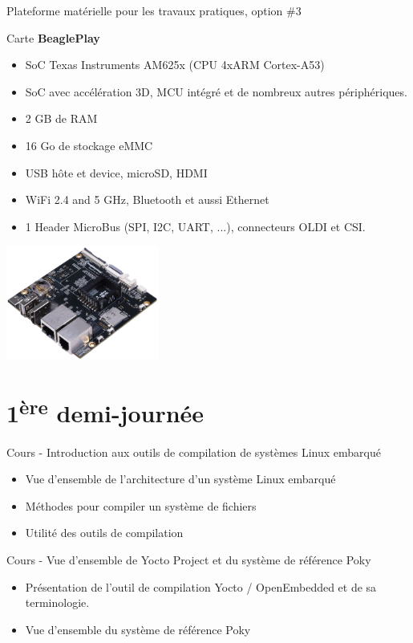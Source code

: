 \documentclass[a4paper,12pt,obeyspaces,spaces,hyphens]{article}
\begin{document}
\feagendatwocolumn
{Plateforme matérielle pour les travaux pratiques, option \#3}
{
  Carte {\bf BeaglePlay}
  \begin{itemize}
    \item SoC Texas Instruments AM625x (CPU 4xARM Cortex-A53)
    \item SoC avec accélération 3D, MCU intégré et de nombreux autres périphériques.
    \item 2 GB de RAM
    \item 16 Go de stockage eMMC
    \item USB hôte et device, microSD, HDMI
    \item WiFi 2.4 and 5 GHz, Bluetooth et aussi Ethernet
    \item 1 Header MicroBus (SPI, I2C, UART, ...), connecteurs OLDI et CSI.
  \end{itemize}
}
{}
{
  \begin{center}
    \includegraphics[width=5cm]{../slides/beagleplay-board/beagleplay.png}
  \end{center}
}

\section{1\textsuperscript{ère} demi-journée}

\feagendaonecolumn
{Cours - Introduction aux outils de compilation de systèmes Linux embarqué}
{
  \begin{itemize}
  \item Vue d'ensemble de l'architecture d'un système Linux embarqué
  \item Méthodes pour compiler un système de fichiers
  \item Utilité des outils de compilation
  \end{itemize}
}

\feagendaonecolumn
{Cours - Vue d'ensemble de Yocto Project et du système de référence Poky}
{
  \begin{itemize}
  \item Présentation de l'outil de compilation Yocto / OpenEmbedded et de sa terminologie.
  \item Vue d'ensemble du système de référence Poky
  \end{itemize}
}
\end{document}
